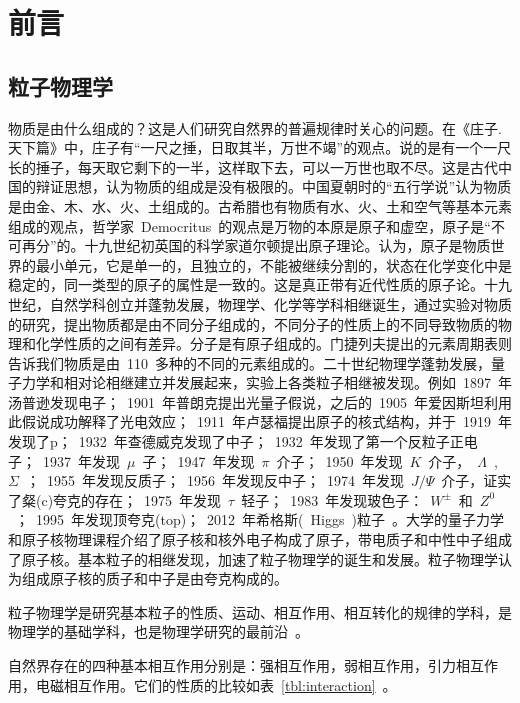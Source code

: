 \chapter{前言}

\section{粒子物理学}

物质是由什么组成的？这是人们研究自然界的普遍规律时关心的问题。在《庄子.天下篇》中，庄子有“一尺之捶，日取其半，万世不竭”的观点。说的是有一个一尺长的捶子，每天取它剩下的一半，这样取下去，可以一万世也取不尽。这是古代中国的辩证思想，认为物质的组成是没有极限的。中国夏朝时的“五行学说”认为物质是由金、木、水、火、土组成的。古希腊也有物质有水、火、土和空气等基本元素组成的观点，哲学家~Democritus~的观点是万物的本原是原子和虚空，原子是“不可再分”的。十九世纪初英国的科学家道尔顿提出原子理论。认为，原子是物质世界的最小单元，它是单一的，且独立的，不能被继续分割的，状态在化学变化中是稳定的，同一类型的原子的属性是一致的。这是真正带有近代性质的原子论。十九世纪，自然学科创立并蓬勃发展，物理学、化学等学科相继诞生，通过实验对物质的研究，提出物质都是由不同分子组成的，不同分子的性质上的不同导致物质的物理和化学性质的之间有差异。分子是有原子组成的。门捷列夫提出的元素周期表则告诉我们物质是由~110~多种的不同的元素组成的。二十世纪物理学蓬勃发展，量子力学和相对论相继建立并发展起来，实验上各类粒子相继被发现。例如~1897~年汤普逊发现电子；~1901~年普朗克提出光量子假说，之后的~1905~年爱因斯坦利用此假说成功解释了光电效应；~1911~年卢瑟福提出原子的核式结构，并于~1919~年发现了p；~1932~年查德威克发现了中子；~1932~年发现了第一个反粒子正电子；~1937~年发现~$\mu$~子；~1947~年发现~$\pi$~介子；~1950~年发现~$K$~介子，~$\Lambda$~,~$\Sigma$~；~1955~年发现反质子；~1956~年发现反中子；~1974~年发现~$J/\Psi$~介子，证实了粲(c)夸克的存在；~1975~年发现~$\tau$~轻子；~1983~年发现玻色子：~$W^{\pm}$~和~$Z^{0}$~；~1995~年发现顶夸克(top)；~2012~年希格斯(~Higgs~)粒子~\cite{ATLAS:2012}\cite{CMS:2012}。大学的量子力学和原子核物理课程介绍了原子核和核外电子构成了原子，带电质子和中性中子组成了原子核。基本粒子的相继发现，加速了粒子物理学的诞生和发展。粒子物理学认为组成原子核的质子和中子是由夸克构成的。~\cite{2014lv}

粒子物理学是研究基本粒子的性质、运动、相互作用、相互转化的规律的学科，是物理学的基础学科，也是物理学研究的最前沿~\cite{zhangns2015}。

自然界存在的四种基本相互作用分别是：强相互作用，弱相互作用，引力相互作用，电磁相互作用。它们的性质的比较如表~\ref{tbl:interaction}~\cite{duds2015}。


